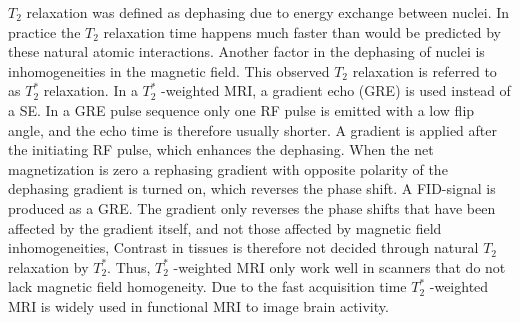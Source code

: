 $T_2$ relaxation was defined as dephasing due to energy exchange between nuclei. In practice the $T_2$ relaxation time happens much faster than would be predicted by these natural atomic interactions. Another factor in the dephasing of nuclei is inhomogeneities in the magnetic field. This observed $T_2$ relaxation is referred to as $T_{2}^*$ relaxation. In a $T_{2}^*$ -weighted MRI, a gradient echo (GRE) is used instead of a SE. In a GRE pulse sequence only one RF pulse is emitted with a low flip angle, and the echo time is therefore usually shorter. A gradient is applied after the initiating RF pulse, which enhances the dephasing. When the net magnetization is zero a rephasing gradient with opposite polarity of the dephasing gradient is turned on, which reverses the phase shift. A FID-signal is produced as a GRE. The gradient only reverses the phase shifts that have been affected by the gradient itself, and not those affected by magnetic field inhomogeneities, Contrast in tissues is therefore not decided through natural $T_2$ relaxation by $T_{2}^*$. Thus, $T_{2}^*$ -weighted MRI only work well in scanners that do not lack magnetic field homogeneity. Due to the fast acquisition time $T_{2}^*$ -weighted MRI is widely used in functional MRI to image brain activity.  \cite{Chavhan2009}  

